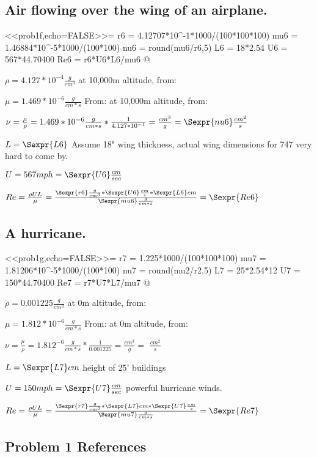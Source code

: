 \documentclass{article}
\begin{document}
\subsection{Air flowing over the wing of an airplane.}

<<prob1f,echo=FALSE>>=
r6 = 4.12707*10^-1*1000/(100*100*100)
mu6 = 1.46884*10^-5*1000/(100*100)
nu6 = round(mu6/r6,5)
L6 = 18*2.54
U6 = 567*44.70400
Re6 = r6*U6*L6/mu6
@

$\rho = 4.127*10^{-4} \frac{g}{cm^{3}}$ at 10,000m altitude, from: ~\cite{USATM}

$\mu = 1.469*10^{-6} \frac{g}{cm*s}$  From: at 10,000m altitude, from:
~\cite{USATM}

$\nu = \frac{\mu}{\rho} = 1.469*10^{-6}\frac{g}{cm*s} * \frac{1}{4.127*10^{-1}}
= \frac{cm^{3}}{g} = \Sexpr{nu6} \frac{cm^{2}}{s}$

$L = \Sexpr{L6}$ Assume 18" wing thickness, actual wing dimensions for 747 very hard to come by. 

$U = 567 mph = \Sexpr{U6}\frac{cm}{sec}$

$Re = \frac{\rho UL}{\mu} = \frac{\Sexpr{r6} \frac{g}{cm^{3}}*\Sexpr{U6}
\frac{cm}{s}*\Sexpr{L6}cm}{\Sexpr{mu6} \frac{g}{cm*s}} = \Sexpr{Re6}$


\subsection{A hurricane.}

<<prob1g,echo=FALSE>>=
r7 = 1.225*1000/(100*100*100)
mu7 = 1.81206*10^-5*1000/(100*100)
nu7 = round(mu2/r2,5)
L7 = 25*2.54*12
U7 = 150*44.70400
Re7 = r7*U7*L7/mu7
@

$\rho = 0.001225 \frac{g}{cm^{3}}$ at 0m altitude, from: ~\cite{USATM}

$\mu = 1.812*10^{-6} \frac{g}{cm*s}$  From: at 0m altitude, from: ~\cite{USATM}

$\nu = \frac{\mu}{\rho} = 1.812^{-6} \frac{g}{cm*s} * \frac{1}{0.001225}
= \frac{cm^{3}}{g} = $ $\frac{cm^{2}}{s}$

$L = \Sexpr{L7} cm$ height of 25' buildings

$U = 150 mph = \Sexpr{U7} \frac{cm}{sec}$ powerful hurricane winds.

$Re = \frac{\rho UL}{\mu} = \frac{\Sexpr{r7} \frac{g}{cm^{3}}*\Sexpr{L7} cm *
\Sexpr{U7} \frac{cm}{s}}{\Sexpr{mu7} \frac{g}{cm*s}} = \Sexpr{Re7}$

\subsection*{Problem 1 References}
\end{document}
